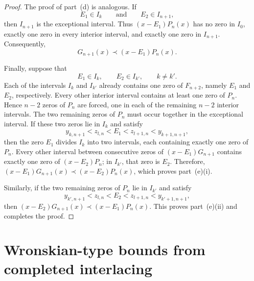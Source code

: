 \documentclass[final,3p,times,12pt]{elsarticle}
\numberwithin{equation}{section}  %
\begin{document}
\begin{proof}
\medskip \noindent The proof of part~(d) is analogous. If
\[
E_1\in I_k
\qquad\text{and}\qquad
E_2\in I_{n+1},
\]
then $I_{n+1}$ is the exceptional interval. Thus
$(x-E_1)P_n(x)$ has no zero in $I_0$, exactly one zero in every
interior interval, and exactly one zero in $I_{n+1}$. Consequently,
\[
G_{n+1}(x)\prec (x-E_1)P_n(x).
\]

\medskip \noindent Finally, suppose that
\[
E_1\in I_k,
\qquad
E_2\in I_{k'},
\qquad
k\neq k'.
\] Each of the intervals $I_k$ and $I_{k'}$ already contains one zero
of $F_{n+2}$, namely $E_1$ and $E_2$, respectively. Every other
interior interval contains at least one zero of $P_n$. Hence
$n-2$ zeros of $P_n$ are forced, one in each of the remaining
$n-2$ interior intervals. The two remaining zeros of $P_n$ must
occur together in the exceptional interval. If these two zeros lie in $I_k$ and satisfy
\[
y_{k,n+1}<z_{l,n}<E_1<z_{l+1,n}<y_{k+1,n+1},
\]
then the zero $E_1$ divides $I_k$ into two intervals, each
containing exactly one zero of $P_n$. Every other interval between
consecutive zeros of $(x-E_1)G_{n+1}$ contains exactly one zero of
$(x-E_2)P_n$; in $I_{k'}$, that zero is $E_2$. Therefore, $(x-E_1)G_{n+1}(x)\prec (x-E_2)P_n(x)$, which proves part~(e)(i).

\medskip \noindent Similarly, if the two remaining zeros of $P_n$ lie in $I_{k'}$ and
satisfy
\[
y_{k',n+1}<z_{l,n}<E_2<z_{l+1,n}<y_{k'+1,n+1},
\]
then $(x-E_2)G_{n+1}(x)\prec (x-E_1)P_n(x)$. This proves part~(e)(ii) and completes the proof.
\end{proof}
     

    
 \section{Wronskian-type bounds from completed interlacing} \label{CI and Wronskian-Turan}
 
\end{document}
